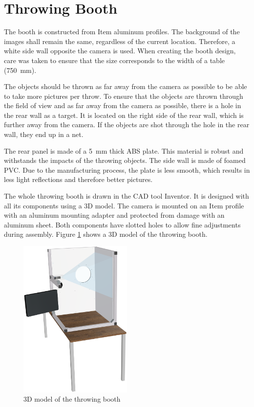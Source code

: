 \section{Throwing Booth}
\label{sec:hardware:throwing_booth}

The booth is constructed from Item aluminum profiles.
The background of the images shall remain the same, regardless of the current location.
Therefore, a white side wall opposite the camera is used.
When creating the booth design, care was taken to ensure that the size corresponds to the width of a table (\SI{750}{mm}).

The objects should be thrown as far away from the camera as possible to be able to take more pictures per throw.
To ensure that the objects are thrown through the field of view and as far away from the camera as possible, there is a hole in the rear wall as a target.
It is located on the right side of the rear wall, which is further away from the camera.
If the objects are shot through the hole in the rear wall, they end up in a net.

The rear panel is made of a \SI{5}{mm} thick ABS plate.
This material is robust and withstands the impacts of the throwing objects.
The side wall is made of foamed PVC.
Due to the manufacturing process, the plate is less smooth, which results in less light reflections and therefore better pictures.

The whole throwing booth is drawn in the CAD tool Inventor. It is designed with all its components using a 3D model.
The camera is mounted on an Item profile with an aluminum mounting adapter and protected from damage with an aluminum sheet.
Both components have slotted holes to allow fine adjustments during assembly.
Figure \ref{fig:booth} shows a 3D model of the throwing booth. 

\begin{figure}[h]
	\centering
	\includegraphics[width=0.5\textwidth]{graphics/top_assembly.png}
	\caption{3D model of the throwing booth}
	\label{fig:booth}
\end{figure}
